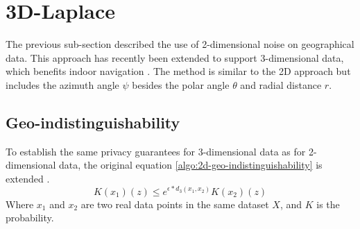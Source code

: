 \section{3D-Laplace}
The previous sub-section described the use of 2-dimensional noise on geographical data.
This approach has recently been extended to support 3-dimensional data, which benefits indoor navigation \citep{9646489}.
The method is similar to the 2D approach but includes the azimuth angle $\psi$ besides the polar angle $\theta$ and radial distance $r$.

\subsection{Geo-indistinguishability}
To establish the same privacy guarantees for 3-dimensional data as for 2-dimensional data, the original equation \ref{algo:2d-geo-indistinguishability} is extended \citep{9646489}.
\begin{equation}
  K(x_1)(z) \le e^{\epsilon * d_3(x_1, x_2)} K(x_2)(z)
  \label{algo:3d-geo-indistinguishability}
\end{equation}
Where $x_1$ and $x_2$ are two real data points in the same dataset $X$, and $K$ is the probability.
